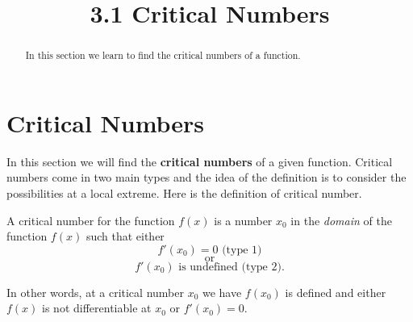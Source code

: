 \documentclass{ximera}
\title{3.1 Critical Numbers}
\begin{document}
\begin{abstract}
In this section we learn to find the critical numbers of a function.
\end{abstract}

\maketitle









\section{Critical Numbers}

In this section we will find the {\bf critical numbers} of a given function. 
Critical numbers come in two main types and the idea of the definition is to consider the possibilities at a local extreme. Here is the definition of  critical number.  \\

\begin{image}
\end{image}



\begin{definition}
A critical number for the function $f(x)$ is a number 
$x_0$ in the {\it domain} of the function $f(x)$ such that either
\[f'(x_0) = 0 \text{  (type 1)}\]
\[ \text{or} \]
\[f'(x_0)  \text{   is undefined  (type 2)}.\]
\end{definition}

In other words, at a critical number $x_0$ we have  $f(x_0)$ is defined and either $f(x)$ is not differentiable at $x_0$ 
 or $f'(x_0) = 0$.
\end{document}
